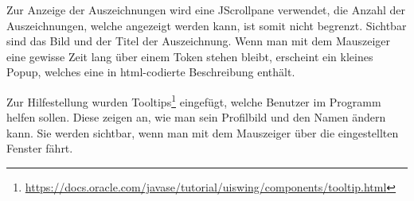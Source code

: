 Zur Anzeige der Auszeichnungen wird eine JScrollpane verwendet, die Anzahl der Auszeichnungen, welche angezeigt werden kann, ist somit nicht begrenzt. Sichtbar sind das Bild und der Titel der Auszeichnung. Wenn man mit dem Mauszeiger eine gewisse Zeit lang über einem Token stehen bleibt, erscheint ein kleines Popup, welches eine in html-codierte Beschreibung enthält.

Zur Hilfestellung wurden Tooltips\footnote{\url{https://docs.oracle.com/javase/tutorial/uiswing/components/tooltip.html}} eingefügt, welche Benutzer im Programm helfen sollen. Diese zeigen an, wie man sein Profilbild und den Namen ändern kann. Sie werden sichtbar, wenn man mit dem Mauszeiger über die eingestellten Fenster fährt.